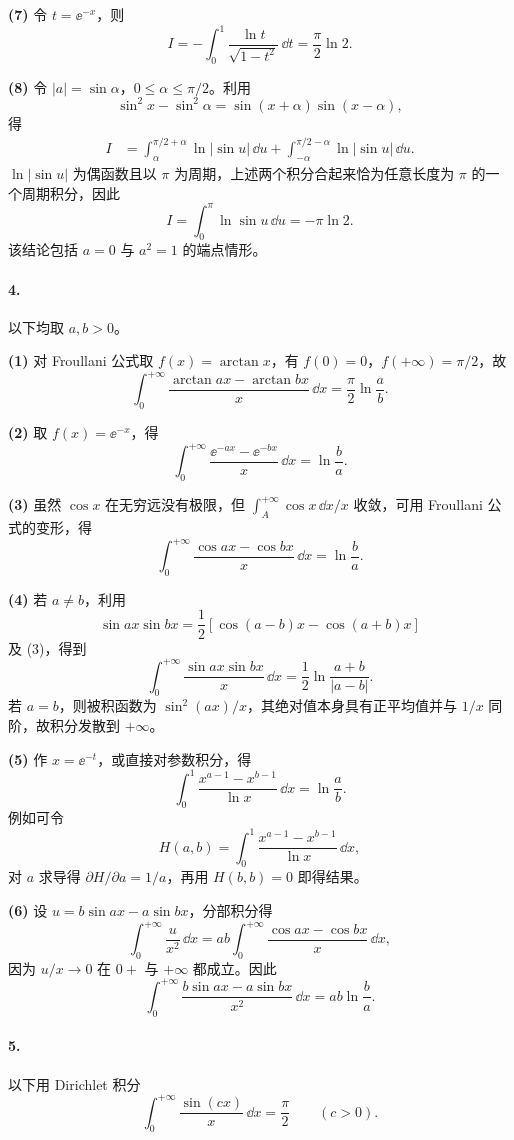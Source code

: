 \textbf{(7)} 令 $t=\ee^{-x}$，则
\[
  I=-\int_0^1\frac{\ln t}{\sqrt{1-t^2}}\,\dd t
  =\boxed{\frac\pi2\ln2}.
\]

\textbf{(8)} 令 $|a|=\sin\alpha$，$0\leq\alpha\leq\pi/2$。利用
\[
  \sin^2x-\sin^2\alpha=\sin(x+\alpha)\sin(x-\alpha),
\]
得
\begin{align*}
  I&=\int_\alpha^{\pi/2+\alpha}\ln|\sin u|\,\dd u
    +\int_{-\alpha}^{\pi/2-\alpha}\ln|\sin u|\,\dd u.
\end{align*}
$\ln|\sin u|$ 为偶函数且以 $\pi$ 为周期，上述两个积分合起来恰为任意长度为 $\pi$ 的一个周期积分，因此
\[
  \boxed{I=\int_0^\pi\ln\sin u\,\dd u=-\pi\ln2}.
\]
该结论包括 $a=0$ 与 $a^2=1$ 的端点情形。

\paragraph{4.}
以下均取 $a,b>0$。

\textbf{(1)} 对 Froullani 公式取 $f(x)=\arctan x$，有 $f(0)=0$，$f(+\infty)=\pi/2$，故
\[
  \boxed{\int_0^{+\infty}\frac{\arctan ax-\arctan bx}{x}\,\dd x
  =\frac\pi2\ln\frac ab}.
\]

\textbf{(2)} 取 $f(x)=\ee^{-x}$，得
\[
  \boxed{\int_0^{+\infty}\frac{\ee^{-ax}-\ee^{-bx}}x\,\dd x=\ln\frac ba}.
\]

\textbf{(3)} 虽然 $\cos x$ 在无穷远没有极限，但 $\int_A^{+\infty}\cos x\,\dd x/x$ 收敛，可用 Froullani 公式的变形，得
\[
  \boxed{\int_0^{+\infty}\frac{\cos ax-\cos bx}{x}\,\dd x=\ln\frac ba}.
\]

\textbf{(4)} 若 $a\ne b$，利用
\[
  \sin ax\sin bx=\frac12[\cos(a-b)x-\cos(a+b)x]
\]
及 (3)，得到
\[
  \boxed{\int_0^{+\infty}\frac{\sin ax\sin bx}{x}\,\dd x
  =\frac12\ln\frac{a+b}{|a-b|}}.
\]
若 $a=b$，则被积函数为 $\sin^2(ax)/x$，其绝对值本身具有正平均值并与 $1/x$ 同阶，故积分发散到 $+\infty$。

\textbf{(5)} 作 $x=\ee^{-t}$，或直接对参数积分，得
\[
  \boxed{\int_0^1\frac{x^{a-1}-x^{b-1}}{\ln x}\,\dd x=\ln\frac ab}.
\]
例如可令
\[
  H(a,b)=\int_0^1\frac{x^{a-1}-x^{b-1}}{\ln x}\,\dd x,
\]
对 $a$ 求导得 $\partial H/\partial a=1/a$，再用 $H(b,b)=0$ 即得结果。

\textbf{(6)} 设 $u=b\sin ax-a\sin bx$，分部积分得
\[
  \int_0^{+\infty}\frac{u}{x^2}\,\dd x
  =ab\int_0^{+\infty}\frac{\cos ax-\cos bx}{x}\,\dd x,
\]
因为 $u/x\to0$ 在 $0+$ 与 $+\infty$ 都成立。因此
\[
  \boxed{\int_0^{+\infty}\frac{b\sin ax-a\sin bx}{x^2}\,\dd x
  =ab\ln\frac ba}.
\]

\paragraph{5.}
以下用 Dirichlet 积分
\[
  \int_0^{+\infty}\frac{\sin(cx)}x\,\dd x=\frac\pi2\qquad(c>0).
\]

